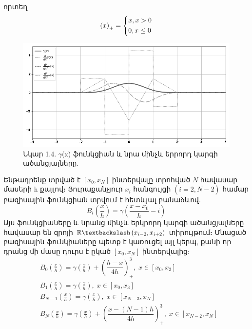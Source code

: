 \documentclass[fleqn, bachelor,subf,12pt,notitlepage]{article}
\begin{document}
որտեղ
\begin{equation}
\left(x\right)_{+}=
\begin{dcases}
x, x > 0 \\
0, x \leq 0	
\end{dcases}
\end{equation}
\begin{figure}[H]
\centering
\includegraphics[width=1.0\textwidth]{images/cubic_compact_support_basis}
\captionsetup{labelformat=empty}
\caption{\hfill Նկար 1.4. $\gamma$(x) ֆունկցիան և նրա մինչև երրորդ կարգի ածանցյալները.}
\end{figure}
Ենթադրենք տրված է $\left[x_{0}, x_{N}\right]$ ինտերվալը տրոհված $N$ հավասար մասերի h քայլով։ Յուրաքանչյուր $x_{i}$ հանգույցի $(i=\overline{2, N-2})$ համար բազիսային ֆունկցիան տրվում է հետևյալ բանաձևով.
\begin{equation}
B_{i}\left(\dfrac{x}{h}\right)=\gamma \left(\frac{x-x_{0}}{h}-i\right)
\end{equation}
Այս ֆունկցիաները և նրանց մինչև երկրորդ կարգի ածանցյալները հավասար են զրոյի $\mathbb{R} \textbackslash \left(x_{i-2}, x_{i+2}\right)$ տիրույթում։
Մնացած բազիսային ֆունկիաները պետք է կառուցել այլ կերպ, քանի որ դրանց մի մասը դուրս է ըկած  $\left[x_{0}, x_{N}\right]$ ինտերվալից։
\begin{equation}
\begin{aligned}
&B_{0}\left(\frac{x}{h}\right) = \gamma \left(\frac{x}{h}\right) + \left(\dfrac{h - x}{4h}\right)^{3}_{+} , \; x \in \left[x_{0}, x_{2}\right] \\
&B_{1}\left(\frac{x}{h}\right) = \gamma \left(\frac{x}{h}\right), \; x \in \left[x_{0}, x_{3}\right]\\
&B_{N-1}\left(\frac{x}{h}\right) = \gamma \left(\frac{x}{h}\right), \; x \in \left[x_{N-3}, x_{N}\right] \\
&B_{N}\left(\frac{x}{h}\right) = \gamma \left(\frac{x}{h}\right) + \left(\dfrac{x - (N-1)h}{4h}\right)^{3}_{+} , \; x \in \left[x_{N-2}, x_{N}\right]
\end{aligned}
\end{equation}
\end{document}
